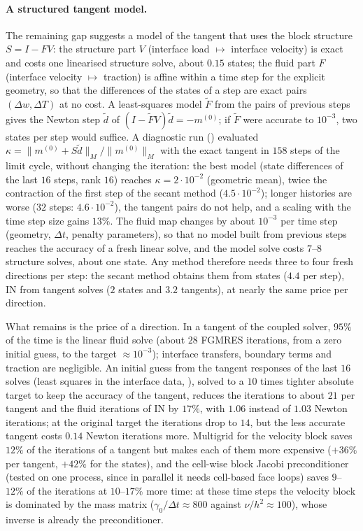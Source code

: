 \documentclass[11pt,a4paper]{article}
\theoremstyle{definition}
\theoremstyle{remark}
\newcommand{\M}{M}
\begin{document}
\paragraph{A structured tangent model.} The remaining gap suggests a model of the tangent that
uses the block structure $S=I-FV$: the structure part $V$ (interface load $\mapsto$ interface
velocity) is exact and costs one linearised structure solve, about $0.15$ states; the fluid part
$F$ (interface velocity $\mapsto$ traction) is affine within a time step for the explicit
geometry, so that the differences of the states of a step are exact pairs $(\Delta w,\Delta T)$ at
no cost. A least-squares model $\tilde F$ from the pairs of previous steps gives the Newton step
$\tilde d$ of $(I-\tilde FV)\tilde d=-m^{(0)}$; if $\tilde F$ were accurate to $10^{-3}$, two states
per step would suffice. A diagnostic run () evaluated
$\kappa=\|m^{(0)}+S\tilde d\|_{\M}/\|m^{(0)}\|_{\M}$ with the exact tangent in $158$ steps of the
limit cycle, without changing the iteration: the best model (state differences of the last $16$
steps, rank $16$) reaches $\kappa=2\cdot10^{-2}$ (geometric mean), twice the contraction of the first
step of the secant method ($4.5\cdot10^{-2}$); longer histories are worse ($32$ steps:
$4.6\cdot10^{-2}$), the tangent pairs do not help, and a scaling with the time step size gains
$13\%$. The fluid map changes by about $10^{-3}$ per time step (geometry, $\Delta t$, penalty
parameters), so that no model built from previous steps reaches the accuracy of a fresh linear
solve, and the model solve costs $7$--$8$ structure solves, about one state. Any method therefore
needs three to four fresh directions per step: the secant method obtains them from states ($4.4$
per step), IN from tangent solves ($2$ states and $3.2$ tangents), at nearly the same price per
direction.

What remains is the price of a direction. In a tangent of the coupled solver, $95\%$ of the time is
the linear fluid solve (about $28$ FGMRES iterations, from a zero initial guess, to the target
$\approx10^{-3}$); interface transfers, boundary terms and traction are negligible. An initial guess
from the tangent responses of the last $16$ solves (least squares in the interface data,
), solved to a $10$ times tighter absolute target to keep the accuracy of
the tangent, reduces the iterations to about $21$ per tangent and the fluid iterations of IN by
$17\%$, with $1.06$ instead of $1.03$ Newton iterations; at the original target the iterations drop
to $14$, but the less accurate tangent costs $0.14$ Newton iterations more. Multigrid for the
velocity block saves $12\%$ of the iterations of a tangent but makes each of them more expensive
($+36\%$ per tangent, $+42\%$ for the states), and the cell-wise block Jacobi preconditioner
(tested on one process, since in parallel it needs cell-based face loops) saves $9$--$12\%$ of the
iterations at $10$--$17\%$ more time: at these time steps the velocity block is dominated by the
mass matrix ($\gamma_0/\Delta t\approx800$ against $\nu/h^2\approx100$), whose inverse is already
the preconditioner.
\end{document}

